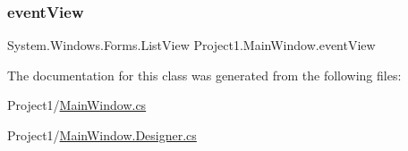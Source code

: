 \subsubsection{\texorpdfstring{event\+View}{eventView}}
{\footnotesize\ttfamily System.\+Windows.\+Forms.\+List\+View Project1.\+Main\+Window.\+event\+View\hspace{0.3cm}{\ttfamily [private]}}



The documentation for this class was generated from the following files\+:\begin{DoxyCompactItemize}
\item 
Project1/\hyperlink{MainWindow_8cs}{Main\+Window.\+cs}\item 
Project1/\hyperlink{MainWindow_8Designer_8cs}{Main\+Window.\+Designer.\+cs}\end{DoxyCompactItemize}
